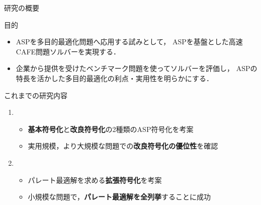 \documentclass[dvipdfmx, 11pt]{beamer}
\begin{document}
\begin{frame}{研究の概要}
 \begin{alertblock}{目的}
  \begin{itemize}
   \item   ASPを多目的最適化問題へ応用する試みとして，
	   ASPを基盤とした高速CAFE問題ソルバーを実現する．
   \item 企業から提供を受けたベンチマーク問題を使ってソルバーを評価し，
	 ASPの特長を活かした多目的最適化の利点・実用性を明らかにする．
  \end{itemize}
 \end{alertblock}
 \begin{block}{これまでの研究内容}
  \begin{enumerate}
   \item {}
	 \begin{itemize}
	  \item {\bf 基本符号化}と{\bf 改良符号化}の2種類のASP符号化を考案
	  \item 実用規模，より大規模な問題での{\bf 改良符号化の優位性}を確認
	 \end{itemize}
   \item {}
	 \begin{itemize}
	  \item パレート最適解を求める{\bf 拡張符号化}を考案
	  \item 小規模な問題で，{\bf パレート最適解を全列挙}することに成功
	 \end{itemize}
  \end{enumerate}
 
 \end{block}
\end{frame}
\end{document}
